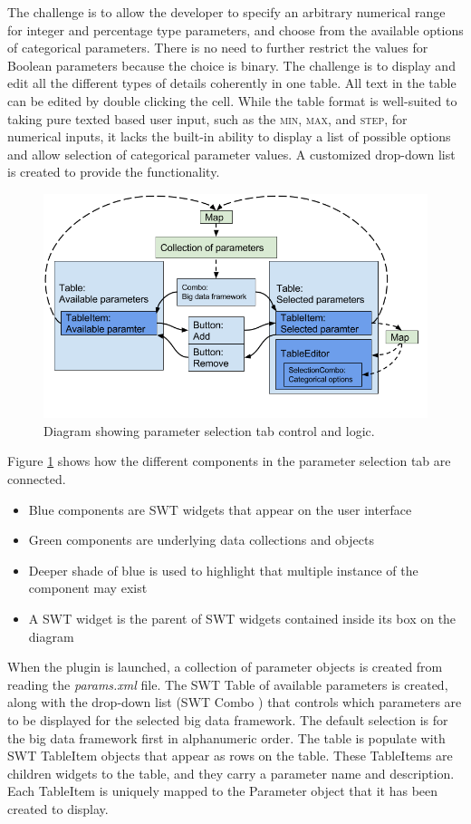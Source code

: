 The challenge is to allow the developer to specify an arbitrary numerical range for integer and percentage type parameters, and choose from the available options of categorical parameters. There is no need to further restrict the values for Boolean parameters because the choice is binary. The challenge is to display and edit all the different types of details coherently in one table. All text in the table can be edited by double clicking the cell. While the table format is well-suited to taking pure texted based user input, such as the \textsc{min}, \textsc{max}, and \textsc{step}, for numerical inputs, it lacks the built-in ability to display a list of possible options and allow selection of categorical parameter values. A customized drop-down list is created to provide the functionality.\\
\begin{figure}[h]
\centering
\caption{Diagram showing parameter selection tab control and logic.}
\label{fig:paramtab}
\includegraphics[width=\textwidth]{images/paramtab.png}
\end{figure}
Figure \ref{fig:paramtab} shows how the different components in the parameter selection tab are connected. 
\begin{itemize}
\item Blue components are SWT widgets that appear on the user interface
\item Green components are underlying data collections and objects
\item Deeper shade of blue is used to highlight that multiple instance of the component may exist
\item A SWT widget is the parent of SWT widgets contained inside its box on the diagram
\end{itemize}
When the plugin is launched, a collection of parameter objects is created from reading the \textit{params.xml} file. The SWT Table \cite{swtwidgets} of available parameters is created, along with the drop-down list (SWT Combo \cite{swtwidgets}) that controls which parameters are to be displayed for the selected big data framework. The default selection is for the big data framework first in alphanumeric order. The table is populate with SWT TableItem objects \cite{swtwidgets} that appear as rows on the table. These TableItems are children widgets to the table, and they carry a parameter name and description. Each TableItem is uniquely mapped to the Parameter object that it has been created to display.\\
